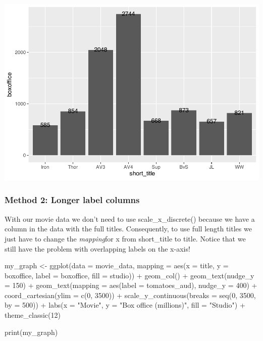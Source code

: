 \documentclass[
]{krantz}
\makeatletter
\newenvironment{Shaded}{\begin{snugshade}}{\end{snugshade}}
\newcommand{\AttributeTok}[1]{\textcolor[rgb]{0.61,0.61,0.61}{#1}}
\newcommand{\DecValTok}[1]{\textcolor[rgb]{0.06,0.06,0.06}{#1}}
\newcommand{\FunctionTok}[1]{\textcolor[rgb]{0,0,0}{#1}}
\newcommand{\NormalTok}[1]{#1}
\newcommand{\OtherTok}[1]{\textcolor[rgb]{0.37,0.37,0.37}{#1}}
\newcommand{\SpecialCharTok}[1]{\textcolor[rgb]{0,0,0}{#1}}
\newcommand{\StringTok}[1]{\textcolor[rgb]{0.5,0.5,0.5}{#1}}
\newenvironment{kframe}{%
\medskip{}
\setlength{\fboxsep}{.8em}
 \def\at@end@of@kframe{}%
 \ifinner\ifhmode%
  \def\at@end@of@kframe{\end{minipage}}%
  \begin{minipage}{\columnwidth}%
 \fi\fi%
 \def\FrameCommand##1{\hskip\@totalleftmargin \hskip-\fboxsep
 \colorbox{shadecolor}{##1}\hskip-\fboxsep
     \hskip-\linewidth \hskip-\@totalleftmargin \hskip\columnwidth}%
 \MakeFramed {\advance\hsize-\width
   \@totalleftmargin\z@ \linewidth\hsize
   \@setminipage}}%
 {\par\unskip\endMakeFramed%
 \at@end@of@kframe}
\renewenvironment{Shaded}{\begin{kframe}}{\end{kframe}}
\makeatother
\begin{document}
\includegraphics[width=0.65\linewidth]{bookdown_files/figure-latex/unnamed-chunk-115-1}

\hypertarget{method-2-longer-label-columns}{%
\subsubsection{Method 2: Longer label columns}\label{method-2-longer-label-columns}}

With our movie data we don't need to use scale\_x\_discrete() because we have a column in the data with the full titles. Consequently, to use full length titles we just have to change the \emph{mapping}for x from short\_title to title. Notice that we still have the problem with overlapping labels on the x-axis!

\begin{Shaded}
\begin{Highlighting}[]
\NormalTok{my\_graph }\OtherTok{\textless{}{-}} \FunctionTok{ggplot}\NormalTok{(}\AttributeTok{data =}\NormalTok{ movie\_data,}
           \AttributeTok{mapping =} \FunctionTok{aes}\NormalTok{(}\AttributeTok{x =}\NormalTok{ title,}
                         \AttributeTok{y =}\NormalTok{ boxoffice,}
                         \AttributeTok{label =}\NormalTok{ boxoffice, }
                         \AttributeTok{fill =}\NormalTok{ studio)) }\SpecialCharTok{+}
  \FunctionTok{geom\_col}\NormalTok{() }\SpecialCharTok{+}
  \FunctionTok{geom\_text}\NormalTok{(}\AttributeTok{nudge\_y =} \DecValTok{150}\NormalTok{)  }\SpecialCharTok{+}
  \FunctionTok{geom\_text}\NormalTok{(}\AttributeTok{mapping =} \FunctionTok{aes}\NormalTok{(}\AttributeTok{label =}\NormalTok{ tomatoes\_aud), }
            \AttributeTok{nudge\_y =} \DecValTok{400}\NormalTok{) }\SpecialCharTok{+}
  \FunctionTok{coord\_cartesian}\NormalTok{(}\AttributeTok{ylim =} \FunctionTok{c}\NormalTok{(}\DecValTok{0}\NormalTok{, }\DecValTok{3500}\NormalTok{)) }\SpecialCharTok{+}
  \FunctionTok{scale\_y\_continuous}\NormalTok{(}\AttributeTok{breaks =} \FunctionTok{seq}\NormalTok{(}\DecValTok{0}\NormalTok{, }\DecValTok{3500}\NormalTok{, }\AttributeTok{by =} \DecValTok{500}\NormalTok{)) }\SpecialCharTok{+}
  \FunctionTok{labs}\NormalTok{(}\AttributeTok{x =} \StringTok{"Movie"}\NormalTok{,}
       \AttributeTok{y =} \StringTok{"Box office (millions)"}\NormalTok{,}
       \AttributeTok{fill =} \StringTok{"Studio"}\NormalTok{) }\SpecialCharTok{+}
  \FunctionTok{theme\_classic}\NormalTok{(}\DecValTok{12}\NormalTok{)}
  

\FunctionTok{print}\NormalTok{(my\_graph)}
\end{Highlighting}
\end{Shaded}
\end{document}
